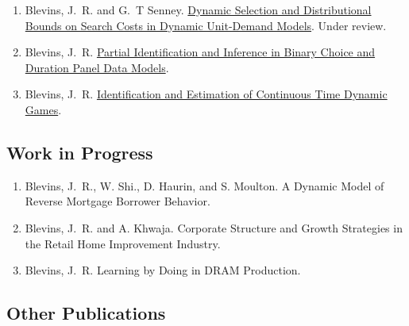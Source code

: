 \documentclass[10pt,letterpaper]{article}
\renewenvironment{itemize}{
  \begin{list}{}{
    \setlength{\leftmargin}{1.5em}
    \setlength{\itemsep}{0.25em}
    \setlength{\parskip}{0pt}
    \setlength{\parsep}{0.25em}
  }
}{
  \end{list}
}
\begin{document}
\begin{enumerate}[resume]
\item Blevins, J.~R. and G.~T Senney.
  \href{http://jblevins.org/research/dcs}{Dynamic Selection and Distributional Bounds on Search Costs in Dynamic Unit-Demand Models}.
  Under review.
\item Blevins, J.~R.
  \href{http://jblevins.org/research/panel}{Partial Identification and Inference in Binary Choice and Duration Panel Data Models}.
\item Blevins, J.~R.
  \href{http://jblevins.org/research/ctgames}{Identification and Estimation of Continuous Time Dynamic Games}.
\end{enumerate}

\subsection*{Work in Progress}

\begin{enumerate}[resume]
\item Blevins, J.~R., W. Shi., D. Haurin, and S. Moulton.
     A Dynamic Model of Reverse Mortgage Borrower Behavior.
\item Blevins, J.~R. and A. Khwaja.
    Corporate Structure and Growth Strategies in the Retail Home Improvement Industry.
\item Blevins, J.~R.
    Learning by Doing in DRAM Production.
\end{enumerate}

%

\subsection*{Other Publications}
\end{document}

